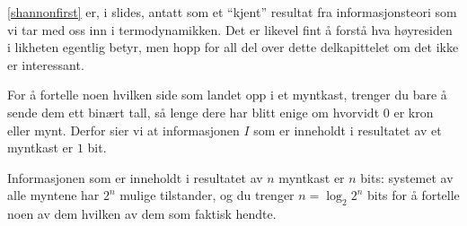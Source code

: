 \eqref{shannonfirst} er, i slides, antatt som et ``kjent'' resultat fra informasjonsteori som vi tar med oss inn i termodynamikken. Det er likevel fint å forstå hva høyresiden i likheten egentlig betyr, men hopp for all del over dette delkapittelet om det ikke er interessant.

For å fortelle noen hvilken side som landet opp i et myntkast, trenger du bare å sende dem ett binært tall, så lenge dere har blitt enige om hvorvidt $0$ er kron eller mynt. Derfor sier vi at informasjonen $I$ som er inneholdt i resultatet av et myntkast er $1$ bit.

Informasjonen som er inneholdt i resultatet av $n$ myntkast er $n$ bits: systemet av alle myntene har $2^n$ mulige tilstander, og du trenger $n=\log_2 2^n$ bits for å fortelle noen av dem hvilken av dem som faktisk hendte.

